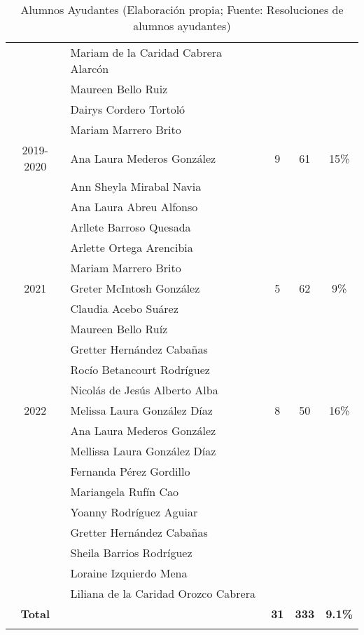 \begin{longtable}{|c|p{7cm}|c|c|c|}
	\cline{2-2}
	& Mariam de la Caridad Cabrera Alarcón& & & \\
	\cline{2-2}
	& Maureen Bello Ruiz& & & \\
	\cline{2-2}
	& Dairys Cordero Tortoló& & & \\
	\cline{2-2}
	& Mariam Marrero Brito& & & \\
	\hline
	2019-2020& Ana Laura Mederos González& 9 & 61 & 15\% \\
	\cline{2-2}
	& Ann Sheyla Mirabal Navia& & & \\
	\cline{2-2}
	& Ana Laura Abreu Alfonso& & & \\
	\cline{2-2}
	& Arllete Barroso Quesada& & & \\
	\cline{2-2}
	& Arlette Ortega Arencibia& & & \\
	\cline{2-2}
	& Mariam Marrero Brito& & & \\
	\hline
	2021& Greter McIntosh González& 5 & 62 & 9\% \\
	\cline{2-2}
	& Claudia Acebo Suárez & & & \\
	\cline{2-2}
	& Maureen Bello Ruíz& & & \\
	\cline{2-2}
	& Gretter Hernández Cabañas& & & \\
	\cline{2-2}
	& Rocío Betancourt Rodríguez& & & \\
	\cline{2-2}
	& Nicolás de Jesús Alberto Alba& & & \\
	\hline
	2022& Melissa Laura González Díaz& 8 & 50 &  16\%\\
	\cline{2-2}
	& Ana Laura Mederos González & & & \\
	\cline{2-2}
	& Mellissa Laura González Díaz& & & \\
	\cline{2-2}
	& Fernanda Pérez Gordillo& & & \\
	\cline{2-2}
	& Mariangela Rufín Cao& & & \\
	\cline{2-2}
	& Yoanny Rodríguez Aguiar& & & \\
	\cline{2-2}
	& Gretter Hernández Cabañas& & & \\
	\cline{2-2}
	& Sheila Barrios Rodríguez& & & \\
	\cline{2-2}
	& Loraine Izquierdo Mena& & & \\
	\cline{2-2}
	& Liliana de la Caridad Orozco Cabrera & & & \\
	\hline
	\textbf{Total}& & \textbf{31}& \textbf{333} & \textbf{9.1\%} \\
	\hline
	
	\caption{Alumnos Ayudantes (Elaboración propia; Fuente: Resoluciones de alumnos ayudantes)}
	\label{tab:AlumnosAyudantes}
\end{longtable}

